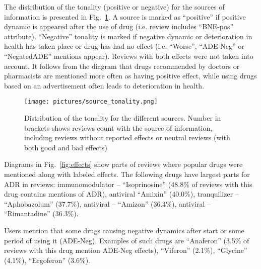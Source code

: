 \documentclass[a4paper,fleqn,longmktitle]{cas-dc}
\begin{document}
The distribution of the tonality (positive or negative) for the sources of information is presented in Fig.~\ref{fig:Distribution_drug_tonality}. A source is marked as ``positive'' if positive dynamic is appeared after the use of drug (i.e. review includes ``BNE-pos'' attribute). ``Negative'' tonality is marked if negative dynamic or deterioration in health has taken place or drug has had no effect (i.e. ``Worse'', ``ADE-Neg'' or ``NegatedADE'' mentions appear). Reviews with both effects were not taken into account. It follows from the diagram that drugs recommended by doctors or pharmacists are mentioned more often as having positive effect, while using drugs based on an advertisement often leads to deterioration in health.
\begin{figure}
    \centering
    \texttt{[image: pictures/source\_tonality.png]}
    
    \caption{Distribution of the tonality for the different sources. Number in brackets shows reviews count with the source of information, including reviews without reported effects or neutral reviews (with both good and bad effects)}
    \label{fig:Distribution_drug_tonality}
\end{figure}

Diagrams in Fig.~\ref{fig:effects} show parts of reviews where popular drugs were mentioned along with labeled effects. The following drugs have largest parts for ADR in reviews: immunomodulator -- ``Isoprinosine'' (48.8\% of reviews with this drug contains mentions of ADR), antiviral ``Amixin'' (40.0\%),  tranquilizer -- ``Aphobazolum'' (37.7\%), antiviral -- ``Amizon'' (36.4\%), antiviral -- ``Rimantadine'' (36.3\%).

Users mention that some drugs causing negative dynamics after start or some period of using it (ADE-Neg). Examples of such drugs are ``Anaferon'' (3.5\% of reviews with this drug mention ADE-Neg effects), ``Viferon'' (2.1\%), ``Glycine'' (4.1\%), ``Ergoferon'' (3.6\%). 
\end{document}
